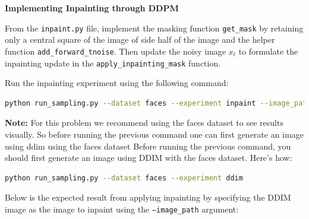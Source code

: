  \textbf{Implementing Inpainting through DDPM}

From the \texttt{inpaint.py} file, implement the masking function \texttt{get\_mask} by retaining only a central square of the image of side half of the image and 
the helper function \texttt{add\_forward\_tnoise}. Then update the noisy image $x_t$ to formulate the inpainting update in the \texttt{apply\_inpainting\_mask} function.

Run the inpainting experiment using the following command:
\begin{lstlisting}[language=bash]
    python run_sampling.py --dataset faces --experiment inpaint --image_path /path/to/image/to/inpaint
\end{lstlisting}

\textbf{Note: }For this problem we recommend using the faces dataset to see results visually. So before running the previous command one can first generate an image using ddim using the faces dataset Before running the previous command, you should first generate an image using DDIM with the faces dataset. Here's how:
\begin{lstlisting}[language=bash]
    python run_sampling.py --dataset faces --experiment ddim 
\end{lstlisting}

Below is the expected result from applying inpainting by specifying the DDIM image as the image to inpaint using the \texttt{--image\_path} argument:

